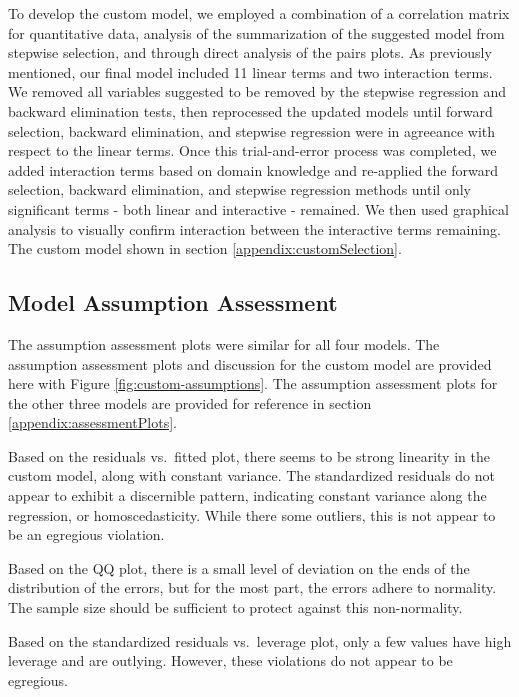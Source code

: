 \documentclass[american,]{article}
\begin{document}
To develop the custom model, we employed a combination of a correlation
matrix for quantitative data, analysis of the summarization of the
suggested model from stepwise selection, and through direct analysis of
the pairs plots. As previously mentioned, our final model included 11
linear terms and two interaction terms. We removed all variables
suggested to be removed by the stepwise regression and backward
elimination tests, then reprocessed the updated models until forward
selection, backward elimination, and stepwise regression were in
agreeance with respect to the linear terms. Once this trial-and-error
process was completed, we added interaction terms based on domain
knowledge and re-applied the forward selection, backward elimination,
and stepwise regression methods until only significant terms - both
linear and interactive - remained. We then used graphical analysis to
visually confirm interaction between the interactive terms remaining.
The custom model shown in section \ref{appendix:customSelection}.

\hypertarget{model-assumption-assessment}{%
\subsection{Model Assumption
Assessment}\label{model-assumption-assessment}}

The assumption assessment plots were similar for all four models. The
assumption assessment plots and discussion for the custom model are
provided here with Figure \ref{fig:custom-assumptions}. The assumption
assessment plots for the other three models are provided for reference
in section \ref{appendix:assessmentPlots}.

Based on the residuals vs.~fitted plot, there seems to be strong
linearity in the custom model, along with constant variance. The
standardized residuals do not appear to exhibit a discernible pattern,
indicating constant variance along the regression, or homoscedasticity.
While there some outliers, this is not appear to be an egregious
violation.

Based on the QQ plot, there is a small level of deviation on the ends of
the distribution of the errors, but for the most part, the errors adhere
to normality. The sample size should be sufficient to protect against
this non-normality.

Based on the standardized residuals vs.~leverage plot, only a few values
have high leverage and are outlying. However, these violations do not
appear to be egregious.
\end{document}
